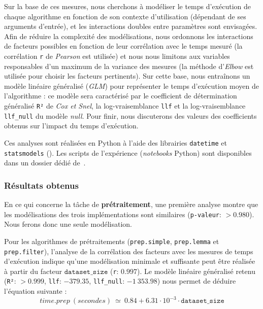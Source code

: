 			Sur la base de ces mesures, nous cherchons à modéliser le temps d'exécution de chaque algorithme en fonction de son contexte d'utilisation (dépendant de ses arguments d'entrée), et les interactions doubles entre paramètres sont envisagées.
			Afin de réduire la complexité des modélisations, nous ordonnons les interactions de facteurs possibles en fonction de leur corrélation avec le temps mesuré (la corrélation \texttt{r} de \textit{Pearson} est utilisée) et nous nous limitons aux variables responsables d'un maximum de la variance des mesures (la méthode d'\textit{Elbow} est utilisée pour choisir les facteurs pertinents).
			Sur cette base, nous entraînons un modèle linéaire généralisé (\textit{GLM}) pour représenter le temps d'exécution moyen de l'algorithme : ce modèle sera caractérisé par le coefficient de détermination généralisé \texttt{R²} de \textit{Cox et Snel}, la log-vraisemblance \texttt{llf} et la log-vraisemblance \texttt{llf\_null} du modèle \textit{null}.
			Pour finir, nous discuterons des valeurs des coefficients obtenus sur l'impact du temps d'exécution.
			
			\begin{leftBarInformation}
				Ces analyses sont réalisées en Python à l'aide des librairies \texttt{datetime} et \texttt{statsmodels} (\cite{seabold:2010}).
				Les scripts de l'expérience (\textit{notebooks} Python) sont disponibles dans un dossier dédié de~\cite{schild:cognitivefactory-interactive-clustering-comparative-study:2021}.
			\end{leftBarInformation}

		\subsubsection{Résultats obtenus}
				
			
			En ce qui concerne la tâche de \textbf{prétraitement}, une première analyse montre que les modélisations des trois implémentations sont similaires (\texttt{p-valeur}: $> 0.980$). Nous ferons donc une seule modélisation.
			
			Pour les algorithmes de prétraitements (\texttt{prep.simple}, \texttt{prep.lemma} et \texttt{prep.filter}), l'analyse de la corrélation des facteurs avec les mesures de temps d'exécution indique qu'une modélisation minimale et suffisante peut être réalisée à partir du facteur $\texttt{dataset\_size}$ (\texttt{r}: $0.997$).
			Le modèle linéaire généralisé retenu (\texttt{R²}: $> 0.999$, \texttt{llf}: $-379.35$, \texttt{llf\_null}: $-1~353.98$) nous permet de déduire l'équation suivante :
			\begin{equation}
				time.prep~(secondes)~
				\simeq~0.84 + 6.31 \cdot 10^{-3} \cdot \texttt{dataset\_size}
			\end{equation}
			
